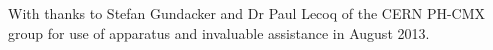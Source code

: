 With thanks to Stefan Gundacker and Dr Paul Lecoq of the CERN PH-CMX group for use of apparatus and invaluable assistance in August 2013.